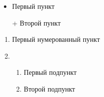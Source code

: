 \documentclass[a4paper]{article}
\begin{document}
    \begin{itemize} %
        \item Первый пункт %
        \item[+] Второй пункт %
    \end{itemize}

    \begin{enumerate} %
        \item Первый нумерованный пункт
        \item \begin{enumerate} %
            \item Первый подпункт
            \item Второй подпункт
        \end{enumerate}
    \end{enumerate}
\end{document}
